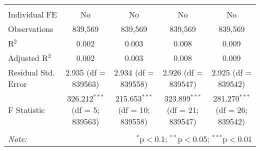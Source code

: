 \documentclass[
]{article}
\begin{document}
\begin{table}[!htbp]
{\begin{tabular}{@{\extracolsep{5pt}}lcccc}
  & & & & \\ 
\hline \\[-1.8ex] 
Individual FE & No & No & No & No \\ 
Observations & 839,569 & 839,569 & 839,569 & 839,569 \\ 
R$^{2}$ & 0.002 & 0.003 & 0.008 & 0.009 \\ 
Adjusted R$^{2}$ & 0.002 & 0.003 & 0.008 & 0.009 \\ 
Residual Std. Error & 2.935 (df = 839563) & 2.934 (df = 839558) & 2.926 (df = 839547) & 2.925 (df = 839542) \\ 
F Statistic & 326.212$^{***}$ (df = 5; 839563) & 215.653$^{***}$ (df = 10; 839558) & 323.899$^{***}$ (df = 21; 839547) & 281.270$^{***}$ (df = 26; 839542) \\ 
\hline 
\hline \\[-1.8ex] 
\textit{Note:}  & \multicolumn{4}{r}{$^{*}$p$<$0.1; $^{**}$p$<$0.05; $^{***}$p$<$0.01} \\ 
\end{tabular}
} 
\end{table} 
\newpage
\end{document}
